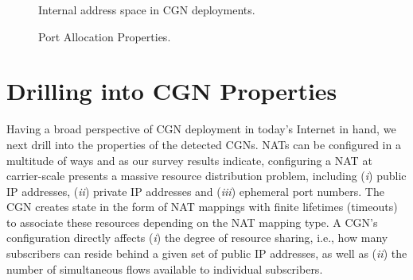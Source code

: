 \documentclass[10pt]{sig-alternate-05-2015}
\def\first{({\it i})\xspace}
\def\second{({\it ii})\xspace}
\def\third{({\it iii})\xspace}
\begin{document}
\begin{figure}
  \begin{center}
  

  \caption{Internal address space in CGN deployments.}
\label{fig:cgnaddressspaces}
  \end{center}
\end{figure}

\begin{figure*}
  \hfill
  \hfill
\caption{Port Allocation Properties.} 
\label{fig:portproperties}
\end{figure*}

\section{Drilling into CGN Properties}
\label{sec:drilling}

Having a broad perspective of CGN deployment in today's Internet in hand, we 
next drill into the properties of the detected CGNs. NATs can be configured in 
a multitude of ways and as our survey results indicate, configuring a NAT at 
carrier-scale presents a massive resource distribution problem, including
\first public IP addresses, \second private IP addresses and 
\third ephemeral port numbers. The CGN creates state in the form of NAT 
mappings with finite lifetimes (timeouts) to associate these resources
depending on the NAT mapping type. A CGN's configuration directly
affects \first the degree of resource sharing, i.e., how many
subscribers can reside behind a given set of public IP addresses, as
well as \second the number of simultaneous flows available to
individual subscribers.
\end{document}
